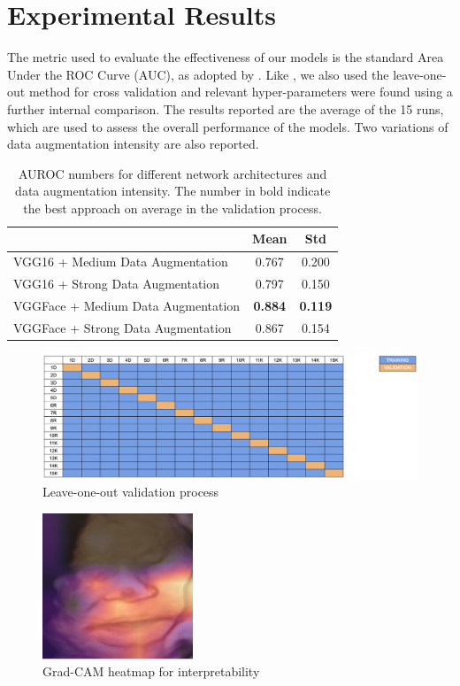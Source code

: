 \chapter{Experimental Results}

The metric used to evaluate the effectiveness of our models is the standard Area Under the ROC Curve (AUC), as adopted by \cite{abs-1807-01631}. Like \cite{CelonaM17}, we also used the leave-one-out method for cross validation and relevant hyper-parameters were found using a further internal comparison. The results reported are the average of the 15 runs, which are used to assess the overall performance of the models. Two variations of data augmentation intensity are also reported.

\begin{table}[h!]
\centering
\caption{AUROC numbers for different network architectures and data augmentation intensity. The number in bold indicate the best approach on average in the validation process.}
\label{tab:results}
\begin{tabular}{lcc}
\hline
\multicolumn{1}{c}{}               & Mean           & Std            \\ \hline
VGG16 + Medium Data Augmentation   & 0.767          & 0.200          \\
VGG16 + Strong Data Augmentation   & 0.797          & 0.150          \\
VGGFace + Medium Data Augmentation & \textbf{0.884} & \textbf{0.119} \\
VGGFace + Strong Data Augmentation & 0.867          & 0.154          \\ \hline
\end{tabular}
\end{table}

\begin{figure}[h!tp]
    \centering
    \includegraphics[width=1\textwidth]{imgs/chap4_validation.png}
    \caption{Leave-one-out validation process}
    \label{fig:validation}
\end{figure}

\begin{figure}[h!tp]
    \centering
    \includegraphics[width=0.4\textwidth]{imgs/chap4_gradcam.png}
    \caption{Grad-CAM heatmap for interpretability}
    \label{fig:gradcam}
\end{figure}

\citep{SelvarajuCDVPB17}

